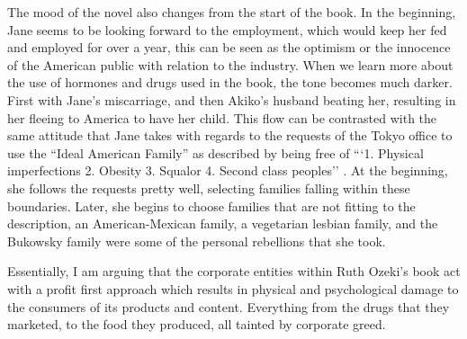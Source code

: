 \documentclass{article}
\begin{document}
The mood of the novel also changes from the start of the book. In the
beginning, Jane seems to be looking forward to the employment, which would
keep her fed and employed for over a year, this can be seen as the optimism
or the innocence of the American public with relation to the industry. When
we learn more about the use of hormones and drugs used in the book, the tone
becomes much darker. First with Jane's miscarriage, and then Akiko's husband
beating her, resulting in her fleeing to America to have her child. This
flow can be contrasted with the same attitude that Jane takes with regards
to the requests of the Tokyo office to use the ``Ideal American Family'' as
described by being free of ```1. Physical imperfections 2. Obesity 3. Squalor
4. Second class peoples'' \cite{ozeki1998my}. At the beginning, she follows
the requests pretty well, selecting families falling within these boundaries.
Later, she begins to choose families that are not fitting to the
description, an American-Mexican family, a vegetarian lesbian family, and
the Bukowsky family were some of the personal rebellions that she took.

Essentially, I am arguing that the corporate entities within Ruth Ozeki's
book  act with a profit first approach which results
in physical and psychological damage to the consumers of its products and
content. Everything from the drugs that they marketed, to the food they
produced, all tainted by corporate greed.

\makeworkscited
\end{document}
